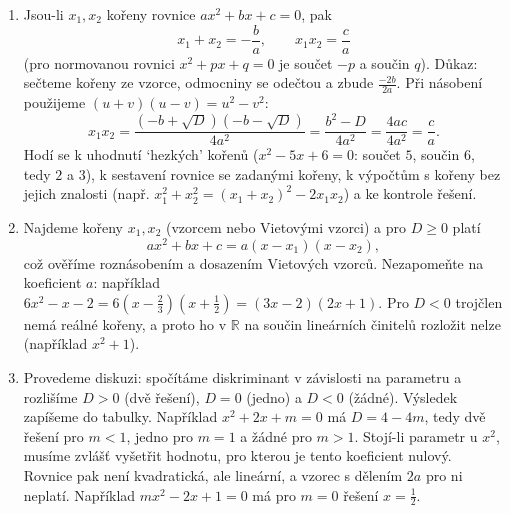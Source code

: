 \begin{enumerate}[label=\textbf{\arabic*.}, leftmargin=*, itemsep=0.8em]
  \item {}
  Jsou-li $x_1, x_2$ kořeny rovnice $ax^2 + bx + c = 0$, pak
  \begin{equation*}
    x_1 + x_2 = -\frac{b}{a}, \qquad x_1x_2 = \frac{c}{a}
  \end{equation*}
  (pro normovanou rovnici $x^2 + px + q = 0$ je součet $-p$ a součin $q$). Důkaz: sečteme kořeny ze vzorce, odmocniny se odečtou a zbude $\frac{-2b}{2a}$. Při násobení použijeme $(u + v)(u - v) = u^2 - v^2$:
  \begin{equation*}
    x_1x_2 = \frac{(-b + \sqrt{D})(-b - \sqrt{D})}{4a^2} = \frac{b^2 - D}{4a^2} = \frac{4ac}{4a^2} = \frac{c}{a}.
  \end{equation*}
  Hodí se k uhodnutí `hezkých' kořenů ($x^2 - 5x + 6 = 0$: součet $5$, součin $6$, tedy $2$ a $3$), k sestavení rovnice se zadanými kořeny, k výpočtům s kořeny bez jejich znalosti (např. $x_1^2 + x_2^2 = {(x_1 + x_2)}^2 - 2x_1x_2$) a ke kontrole řešení. 

  \item {}
  Najdeme kořeny $x_1, x_2$ (vzorcem nebo Vietovými vzorci) a pro $D\geq 0$ platí
  \begin{equation*}
    ax^2 + bx + c = a(x - x_1)(x - x_2),
  \end{equation*}
  což ověříme roznásobením a dosazením Vietových vzorců. Nezapomeňte na koeficient $a$: například $6x^2 - x - 2 = 6\left(x - \frac{2}{3}\right)\left(x + \frac{1}{2}\right) = (3x - 2)(2x + 1)$. Pro $D < 0$ trojčlen nemá reálné kořeny, a proto ho v $\mathbb{R}$ na součin lineárních činitelů rozložit nelze (například $x^2 + 1$).

  \item {}
  Provedeme diskuzi: spočítáme diskriminant v závislosti na parametru a rozlišíme $D > 0$ (dvě řešení), $D = 0$ (jedno) a $D < 0$ (žádné). Výsledek zapíšeme do tabulky. Například $x^2 + 2x + m = 0$ má $D = 4 - 4m$, tedy dvě řešení pro $m < 1$, jedno pro $m = 1$ a žádné pro $m > 1$. Stojí-li parametr u $x^2$, musíme zvlášť vyšetřit hodnotu, pro kterou je tento koeficient nulový. Rovnice pak není kvadratická, ale lineární, a vzorec s dělením $2a$ pro ni neplatí. Například $mx^2 - 2x + 1 = 0$ má pro $m = 0$ řešení $x = \frac{1}{2}$. 


\end{enumerate}
